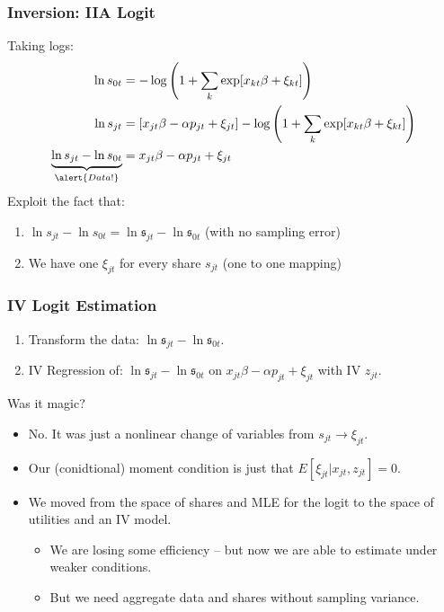 \documentclass[xcolor=pdftex,dvipsnames,table,mathserif,aspectratio=169]{beamer}
\begin{document}
\begin{frame}
\frametitle{Inversion: IIA Logit}
Taking logs:
\begin{align*}
\ln s_{0t} &= -\log \left(1+\sum_k \exp[x_{kt} \beta + \xi_{kt}] \right) \\
\ln s_{jt} &= [x_{jt} \beta - \alpha p_{jt} +  \xi_{jt} ] - \log \left(1+\sum_k \exp[x_{kt} \beta + \xi_{kt}] \right)\\
\underbrace{\ln s_{jt}- \ln s_{0t}}_{\alert{Data!}} &= x_{jt} \beta -\alpha p_{jt} +  \xi_{jt}
\end{align*}
Exploit the fact that: 
\begin{enumerate}
\item $\ln s_{jt}- \ln s_{0t}= \ln \mathfrak{s}_{jt}- \ln \mathfrak{s}_{0t}$  (with no sampling error)
\item We have one $\xi_{jt}$ for every share $s_{jt}$ (one to one mapping)
\end{enumerate}
\end{frame}

\begin{frame}
\frametitle{IV Logit Estimation}
\begin{enumerate}
\item Transform the data: $\ln \mathfrak{s}_{jt}- \ln \mathfrak{s}_{0t}$. 
\item IV Regression of: $\ln \mathfrak{s}_{jt}- \ln \mathfrak{s}_{0t}$ on $x_{jt} \beta -\alpha p_{jt} +  \xi_{jt}$ with IV $z_{jt}$.
\end{enumerate}
Was it magic?
\begin{itemize}
\item No. It was just a nonlinear change of variables from $s_{jt} \rightarrow \xi_{jt}$.
\item Our (conidtional) moment condition is just that $E[\xi_{jt} | x_{jt}, z_{jt}]=0$.
\item We moved from the space of shares and MLE for the logit to the space of utilities and an IV model.
\begin{itemize}
\item We are losing some efficiency -- but now we are able to estimate under weaker conditions.
\item But we need \alert{aggregate data} and shares without sampling variance.
 \end{itemize}
 \end{itemize}
\end{frame}
\end{document}
